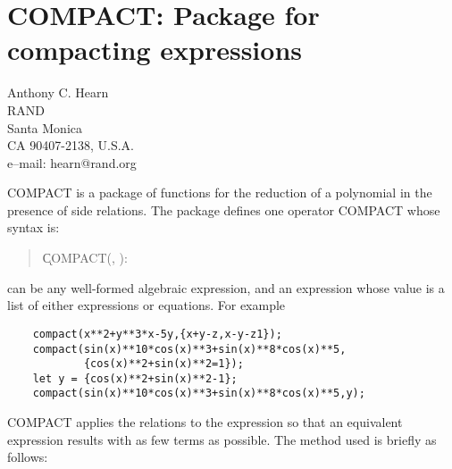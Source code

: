 \chapter[COMPACT: Compacting expressions]{COMPACT: Package for compacting expressions} 
\label{COMPACT}

{\footnotesize
\begin{center}
Anthony C. Hearn\\
RAND\\
Santa Monica \\
CA 90407-2138, U.S.A. \\[0.05in]
e--mail: hearn@rand.org
\end{center}
}

{COMPACT} is a package of functions for the reduction of a polynomial in
the presence of side relations.  The package defines one operator {COMPACT}
whose syntax is:

\begin{quote}
\k{COMPACT}(, ):
\end{quote}

 can be any well-formed algebraic expression, and
 an expression whose value is a list
of either expressions or equations.  For example

\begin{verbatim}
    compact(x**2+y**3*x-5y,{x+y-z,x-y-z1});
    compact(sin(x)**10*cos(x)**3+sin(x)**8*cos(x)**5,
            {cos(x)**2+sin(x)**2=1});
    let y = {cos(x)**2+sin(x)**2-1};
    compact(sin(x)**10*cos(x)**3+sin(x)**8*cos(x)**5,y);
\end{verbatim}

{COMPACT} applies the relations to the expression so that an equivalent
expression results with as few terms as possible.  The method used is
briefly as follows:

